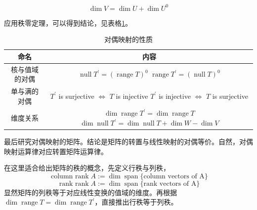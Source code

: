 \documentclass{tufte-book}
\begin{document}
\[\dim V = \dim U + \dim U^0\]
\par 应用秩零定理，可以得到结论，见表格\ref{对偶映射的性质}。
\begin{table}
    \centering
    \begin{tabular}{cc}
        \toprule
        命名           & 内容                                                                           \\
        \midrule
        核与值域的对偶 & \makecell{\(\operatorname{null}T^\prime = (\operatorname{range}T)^0\)          \\ \(\operatorname{range}T^\prime = (\operatorname{null}T)^0\)}\\
        单与满的对偶   & \makecell{\(T^\prime\) is surjective \(\Leftrightarrow\) \(T\) is injective    \\ \(T^\prime\) is injective \(\Leftrightarrow\) \(T\) is surjective} \\
        维度关系       & \makecell{\(\dim \operatorname{range} T^\prime = \dim \operatorname{range} T\) \\ \(\dim\operatorname{null} T^\prime = \dim\operatorname{null} T + \dim W - \dim V\) } \\
        \bottomrule
    \end{tabular}
    \caption{对偶映射的性质}
    \label{对偶映射的性质}
\end{table}
\par 最后研究对偶映射的矩阵。结论是矩阵的转置与线性映射的对偶等价。自然，对偶映射运算律对应转置矩阵运算律。
\par 在这里适合给出矩阵的秩的概念，先定义行秩与列秩，
\[\operatorname{column\ rank} A := \dim \operatorname{span} \{\text{column vectors of A}\}\]
\[\operatorname{rank\ rank} A := \dim \operatorname{span} \{\text{rank vectors of A}\}\]
显然矩阵的列秩等于对应线性变换的值域的维度。再根据\(\dim \operatorname{range} T = \dim \operatorname{range} T^\prime \)，直接推出行秩等于列秩。
\end{document}
